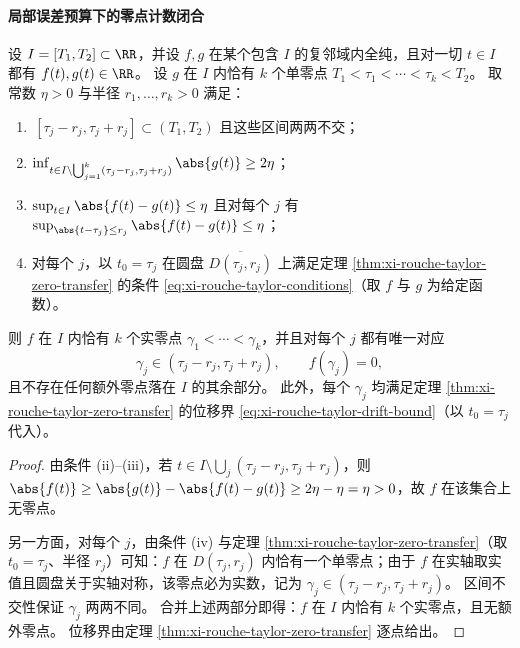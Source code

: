 \paragraph{局部误差预算下的零点计数闭合}
\begin{theorem}\label{thm:xi-local-zero-count-closure-budget}
设 \(I=[T_1,T_2]\subset\RR\)，并设 \(f,g\) 在某个包含 \(I\) 的复邻域内全纯，且对一切 \(t\in I\) 都有 \(f(t),g(t)\in\RR\)。
设 \(g\) 在 \(I\) 内恰有 \(k\) 个单零点
\(
T_1<\tau_1<\cdots<\tau_k<T_2
\)。
取常数 \(\eta>0\) 与半径 \(r_1,\dots,r_k>0\) 满足：
\begin{enumerate}
  \item \(\,[\tau_j-r_j,\tau_j+r_j]\subset (T_1,T_2)\) 且这些区间两两不交；
  \item \(\inf_{t\in I\setminus \bigcup_{j=1}^{k}(\tau_j-r_j,\tau_j+r_j)}\abs{g(t)}\ge 2\eta\)；
  \item \(\sup_{t\in I}\abs{f(t)-g(t)}\le \eta\) 且对每个 \(j\) 有 \(\sup_{\abs{t-\tau_j}\le r_j}\abs{f(t)-g(t)}\le \eta\)；
  \item 对每个 \(j\)，以 \(t_0=\tau_j\) 在圆盘 \(\overline{D(\tau_j,r_j)}\) 上满足定理 \ref{thm:xi-rouche-taylor-zero-transfer} 的条件 \eqref{eq:xi-rouche-taylor-conditions}（取 \(f\) 与 \(g\) 为给定函数）。
\end{enumerate}
则 \(f\) 在 \(I\) 内恰有 \(k\) 个实零点 \(\gamma_1<\cdots<\gamma_k\)，并且对每个 \(j\) 都有唯一对应
\[
\gamma_j\in (\tau_j-r_j,\tau_j+r_j),
\qquad
f(\gamma_j)=0,
\]
且不存在任何额外零点落在 \(I\) 的其余部分。
此外，每个 \(\gamma_j\) 均满足定理 \ref{thm:xi-rouche-taylor-zero-transfer} 的位移界 \eqref{eq:xi-rouche-taylor-drift-bound}（以 \(t_0=\tau_j\) 代入）。
\end{theorem}
\begin{proof}
由条件 (ii)--(iii)，若 \(t\in I\setminus \bigcup_j(\tau_j-r_j,\tau_j+r_j)\)，则
\(
\abs{f(t)}\ge \abs{g(t)}-\abs{f(t)-g(t)}\ge 2\eta-\eta=\eta>0
\)，故 \(f\) 在该集合上无零点。
\par
另一方面，对每个 \(j\)，由条件 (iv) 与定理 \ref{thm:xi-rouche-taylor-zero-transfer}（取 \(t_0=\tau_j\)、半径 \(r_j\)）可知：\(f\) 在 \(D(\tau_j,r_j)\) 内恰有一个单零点；由于 \(f\) 在实轴取实值且圆盘关于实轴对称，该零点必为实数，记为 \(\gamma_j\in(\tau_j-r_j,\tau_j+r_j)\)。
区间不交性保证 \(\gamma_j\) 两两不同。
合并上述两部分即得：\(f\) 在 \(I\) 内恰有 \(k\) 个实零点，且无额外零点。
位移界由定理 \ref{thm:xi-rouche-taylor-zero-transfer} 逐点给出。
\end{proof}

